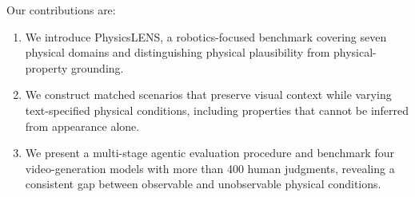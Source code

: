 \documentclass{article} %
\begin{document}
Our contributions are:
\begin{enumerate}
\item We introduce PhysicsLENS, a robotics-focused benchmark covering seven physical domains and distinguishing physical plausibility from physical-property grounding.
\item We construct matched scenarios that preserve visual context while varying text-specified physical conditions, including properties that cannot be inferred from appearance alone.
\item We present a multi-stage agentic evaluation procedure and benchmark four video-generation models with more than 400 human judgments, revealing a consistent gap between observable and unobservable physical conditions.
\end{enumerate}

\end{document}
